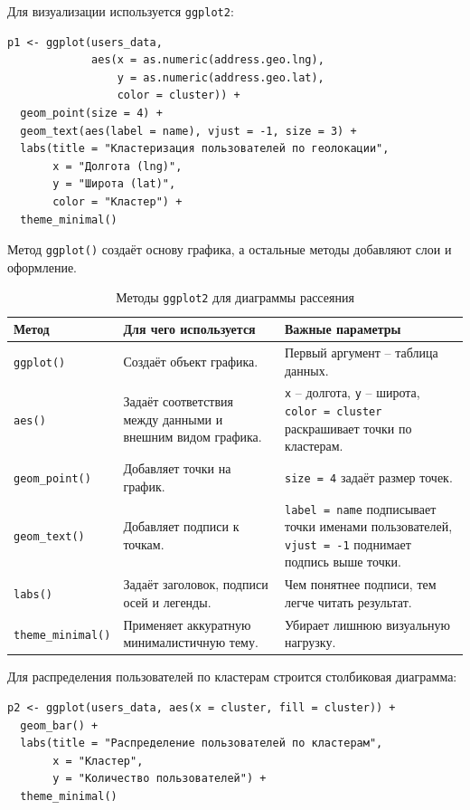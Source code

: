 \documentclass[14pt,a4paper]{extarticle}
\begin{document}
Для визуализации используется \texttt{ggplot2}:

\begin{lstlisting}
p1 <- ggplot(users_data,
             aes(x = as.numeric(address.geo.lng),
                 y = as.numeric(address.geo.lat),
                 color = cluster)) +
  geom_point(size = 4) +
  geom_text(aes(label = name), vjust = -1, size = 3) +
  labs(title = "Кластеризация пользователей по геолокации",
       x = "Долгота (lng)",
       y = "Широта (lat)",
       color = "Кластер") +
  theme_minimal()
\end{lstlisting}

Метод \texttt{ggplot()} создаёт основу графика, а остальные методы добавляют слои и оформление.

\begin{table}[H]
\caption{Методы \texttt{ggplot2} для диаграммы рассеяния}
\begin{tabularx}{\textwidth}{|l|Y|Y|}
\hline
\textbf{Метод} & \textbf{Для чего используется} & \textbf{Важные параметры} \\
\hline
\texttt{ggplot()} & Создаёт объект графика. & Первый аргумент -- таблица данных. \\
\hline
\texttt{aes()} & Задаёт соответствия между данными и внешним видом графика. & \texttt{x} -- долгота, \texttt{y} -- широта, \texttt{color = cluster} раскрашивает точки по кластерам. \\
\hline
\texttt{geom\_point()} & Добавляет точки на график. & \texttt{size = 4} задаёт размер точек. \\
\hline
\texttt{geom\_text()} & Добавляет подписи к точкам. & \texttt{label = name} подписывает точки именами пользователей, \texttt{vjust = -1} поднимает подпись выше точки. \\
\hline
\texttt{labs()} & Задаёт заголовок, подписи осей и легенды. & Чем понятнее подписи, тем легче читать результат. \\
\hline
\texttt{theme\_minimal()} & Применяет аккуратную минималистичную тему. & Убирает лишнюю визуальную нагрузку. \\
\hline
\end{tabularx}
\end{table}

Для распределения пользователей по кластерам строится столбиковая диаграмма:

\begin{lstlisting}
p2 <- ggplot(users_data, aes(x = cluster, fill = cluster)) +
  geom_bar() +
  labs(title = "Распределение пользователей по кластерам",
       x = "Кластер",
       y = "Количество пользователей") +
  theme_minimal()
\end{lstlisting}
\end{document}
